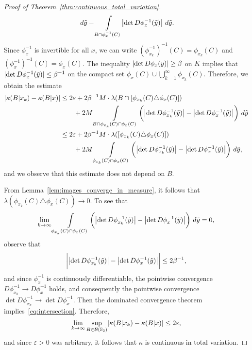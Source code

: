 \documentclass[11pt,onecolumn]{IEEEtran}  %
\newcommand{\Sb}{\mathbb{S}}
\newcommand{\Bc}{\mathcal{B}}
\newcommand{\inv}{^{-1}}
\DeclarePairedDelimiter{\abs}{|}{|}
\theoremstyle{definition}
\begin{document}
\begin{proof}[{Proof of Theorem~\ref{thm:continuous_total_variation}}]
\begin{align*}
{            \ d\tilde y -
            \int\limits_{B \cap \phi^{-1}_{x}(C)}
            \abs*{\det D\phi^{-1}_{x}(\tilde y)}
            \ d\tilde y
        }.
    \end{align*}
    Since $\phi^{-1}_{x}$ is invertible for all $x$, we can write $(\phi^{-1}_{x_k})^{-1} (C) = \phi_{x_k} (C)$ and $(\phi^{-1}_{x})^{-1} (C) = \phi_{x} (C)$. The inequality $\abs{\det D \phi_x(y)} \geq \beta$ on $K$ implies that $\abs{\det D \phi^{-1}_x(\tilde y)} \leq \beta\inv$ on the compact set $\phi_{x}(C) \cup \bigcup_{k=1}^{\infty} \phi_{x_k}(C)$. Therefore, we obtain the estimate
    \begin{align*}
        \begin{split}
        \abs*{\kappa(B|x_k) - \kappa(B|x)} &\leq
         2\varepsilon + 2\beta\inv M\cdot \lambda(B \cap [\phi_{x_k} (C) \triangle \phi_{x} (C)]) \\
        &\qquad +
        2M\int\limits_{B \cap \phi_{x_k} (C) \cap \phi_{x} (C)} \bigg(\abs*{\det D \phi^{-1}_{x_k}(\tilde y)} - \abs*{\det D \phi^{-1}_{x}(\tilde y)}\bigg) \ d\tilde y \\
        &\leq
         2\varepsilon + 2\beta\inv M\cdot \lambda([\phi_{x_k} (C) \triangle \phi_{x} (C)]) \\
        &\qquad +
        2M\int\limits_{\phi_{x_k} (C) \cap \phi_{x} (C)} \bigg(\abs*{\det D \phi^{-1}_{x_k}(\tilde y)} - \abs*{\det D \phi^{-1}_{x}(\tilde y)}\bigg) \ d\tilde y,
        \end{split}
    \end{align*}
    and we observe that this estimate does not depend on $B$.

    From Lemma~\ref{lem:images_converge_in_measure}, it follows that $\lambda(\phi_{x_k}(C) \triangle \phi_{x}( C)) \to 0$. To see that
    \begin{equation} \label{eq:intersection}
        \lim_{k \to \infty} \int\limits_{\phi_{x_k}(C) \cap \phi_{x}(C)} \bigg(\abs*{\det D\phi^{-1}_{x_k}(\tilde y)} - \abs*{\det D \phi^{-1}_{x} (\tilde y)}\bigg) \ d\tilde y = 0,
    \end{equation}
     observe that
    \begin{equation*}
        \bigg|\abs*{\det D \phi^{-1}_{x_k}(\tilde{y})} - \abs*{\det D\phi^{-1}_{x}(\tilde y)}\bigg|\leq 2\beta\inv,
    \end{equation*}
    and since $\phi^{-1}_x$ is continuously differentiable, the pointwise convergence $D \phi^{-1}_{x_k} \to D \phi^{-1}_{x}$ holds, and consequently the pointwise convergence $\det D\phi^{-1}_{x_k} \to \det D \phi^{-1}_{x}$. Then the dominated convergence theorem implies~\eqref{eq:intersection}. Therefore,
    \begin{equation*}
        \lim_{k \to \infty} \sup_{B \in \Bc(\Sb_2)} \abs*{\kappa(B|x_k) - \kappa(B|x)} \leq 2\varepsilon,
    \end{equation*}
    and since $\varepsilon > 0$ was arbitrary, it follows that $\kappa$ is continuous in total variation.
\end{proof}
\end{document}
